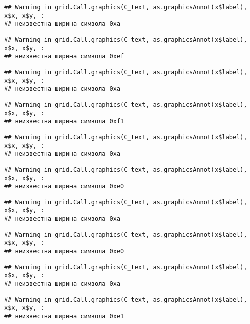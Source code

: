 \documentclass[
]{article}
\begin{document}
\begin{verbatim}
## Warning in grid.Call.graphics(C_text, as.graphicsAnnot(x$label), x$x, x$y, :
## неизвестна ширина символа 0xa
\end{verbatim}

\begin{verbatim}
## Warning in grid.Call.graphics(C_text, as.graphicsAnnot(x$label), x$x, x$y, :
## неизвестна ширина символа 0xef
\end{verbatim}

\begin{verbatim}
## Warning in grid.Call.graphics(C_text, as.graphicsAnnot(x$label), x$x, x$y, :
## неизвестна ширина символа 0xa
\end{verbatim}

\begin{verbatim}
## Warning in grid.Call.graphics(C_text, as.graphicsAnnot(x$label), x$x, x$y, :
## неизвестна ширина символа 0xf1
\end{verbatim}

\begin{verbatim}
## Warning in grid.Call.graphics(C_text, as.graphicsAnnot(x$label), x$x, x$y, :
## неизвестна ширина символа 0xa
\end{verbatim}

\begin{verbatim}
## Warning in grid.Call.graphics(C_text, as.graphicsAnnot(x$label), x$x, x$y, :
## неизвестна ширина символа 0xe0
\end{verbatim}

\begin{verbatim}
## Warning in grid.Call.graphics(C_text, as.graphicsAnnot(x$label), x$x, x$y, :
## неизвестна ширина символа 0xa
\end{verbatim}

\begin{verbatim}
## Warning in grid.Call.graphics(C_text, as.graphicsAnnot(x$label), x$x, x$y, :
## неизвестна ширина символа 0xe0
\end{verbatim}

\begin{verbatim}
## Warning in grid.Call.graphics(C_text, as.graphicsAnnot(x$label), x$x, x$y, :
## неизвестна ширина символа 0xa
\end{verbatim}

\begin{verbatim}
## Warning in grid.Call.graphics(C_text, as.graphicsAnnot(x$label), x$x, x$y, :
## неизвестна ширина символа 0xe1
\end{verbatim}
\end{document}
